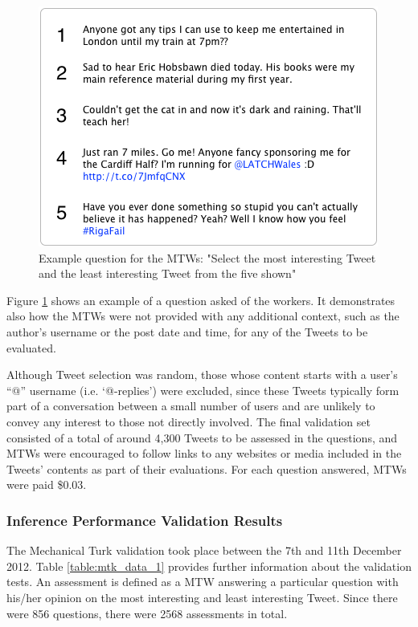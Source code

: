 \begin{figure}[h]
\centering
\includegraphics[scale=0.8]{4.Chapter2/Media/mtk_question.png} 
\caption{Example question for the MTWs: "Select the most interesting Tweet and the least interesting Tweet from the five shown"}
\label{fig:mtk_question}
\end{figure}

Figure \ref{fig:mtk_question} shows an example of a question asked of the workers. It demonstrates also how the MTWs were not provided with any additional context, such as the author's username or the post date and time, for any of the Tweets to be evaluated.

Although Tweet selection was random, those whose content starts with a user's ``@'' username (i.e. `@-replies') were excluded, since these Tweets typically form part of a conversation between a small number of users and are unlikely to convey any interest to those not directly involved. The final validation set consisted of a total of around 4,300 Tweets to be assessed in the questions, and MTWs were encouraged to follow links to any websites or media included in the Tweets' contents as part of their evaluations. For each question answered, MTWs were paid \$0.03. 


\subsubsection{Inference Performance Validation Results}
\label{section:initial_inference_results}
The Mechanical Turk validation took place between the 7th and 11th December 2012. Table \ref{table:mtk_data_1} provides further information about the validation tests. An assessment is defined as a MTW answering a particular question with his/her opinion on the most interesting and least interesting Tweet. Since there were 856 questions, there were 2568 assessments in total.

